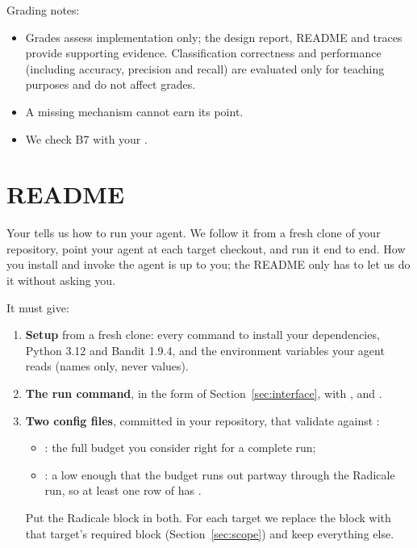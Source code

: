 \documentclass[9pt,letterpaper]{article}
\begin{document}
Grading notes:
\begin{itemize}
\item Grades assess implementation only; the design report, README and traces
  provide supporting evidence. Classification correctness and performance
  (including accuracy, precision and recall) are evaluated only for teaching
  purposes and do not affect grades.
\item A missing mechanism cannot earn its point.
\item We check B7 with your .
\end{itemize}

\section{README}\label{sec:readme}

Your  tells us how to run your agent. We follow it from a fresh
clone of your repository, point your agent at each target checkout, and run it
end to end. How you install and invoke the agent is up to you; the README only
has to let us do it without asking you.

It must give:
\begin{enumerate}
\item \textbf{Setup} from a fresh clone: every command to install your
  dependencies, Python 3.12 and Bandit 1.9.4, and the environment variables your
  agent reads (names only, never values).
\item \textbf{The run command}, in the form of Section~\ref{sec:interface}, with
  ,  and .
\item \textbf{Two config files}, committed in your repository, that validate
  against :
  \begin{itemize}
  \item {}: the full budget you consider right for a
    complete run;
  \item {}: a  low enough that the budget
    runs out partway through the Radicale run, so at least one row of
     has  .
  \end{itemize}
  Put the Radicale \code{[scan]} block in both. For each target we replace the
  \code{[scan]} block with that target's required block
  (Section~\ref{sec:scope}) and keep everything else.
\end{enumerate}
\end{document}
